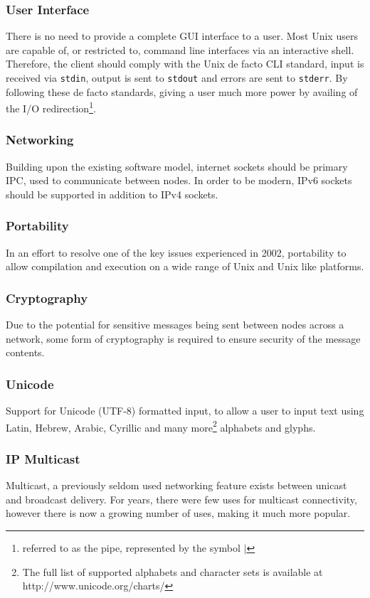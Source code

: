 
\subsubsection{User Interface}

There is no need to provide a complete GUI interface to a user. Most
Unix users are capable of, or restricted to, command line interfaces via
an interactive shell. Therefore, the client should comply with the 
Unix de facto CLI standard, input is received via \verb!stdin!, output
is sent to \verb!stdout! and errors are sent to \verb!stderr!. By
following these de facto standards, giving a user much more power by
availing of the 
I/O redirection\footnote{referred to as the pipe, represented by the symbol $\mid$}.

\subsubsection{Networking}

Building upon the existing software model, internet sockets should be 
primary IPC, used to communicate between nodes. In order to be modern,
IPv6 sockets should be supported in addition to IPv4 sockets.

\subsubsection{Portability}

In an effort to resolve one of the key issues experienced in 2002, 
portability to allow compilation and execution on a wide range of Unix
and Unix like platforms.

\subsubsection{Cryptography}

Due to the potential for sensitive messages being sent between nodes
across a network, some form of cryptography is required to ensure 
security of the message contents.

\subsubsection{Unicode}

Support for Unicode (UTF-8) formatted input, to allow a user to input 
text using Latin, Hebrew, Arabic, Cyrillic and many 
more\footnote{The full list of supported alphabets and character sets is available at http://www.unicode.org/charts/}
alphabets and glyphs. 

\subsubsection{IP Multicast}

Multicast, a previously seldom used networking feature exists between 
unicast and broadcast delivery. For years, there were few uses for 
multicast connectivity, however there is now a growing number of uses, 
making it much more popular. 

